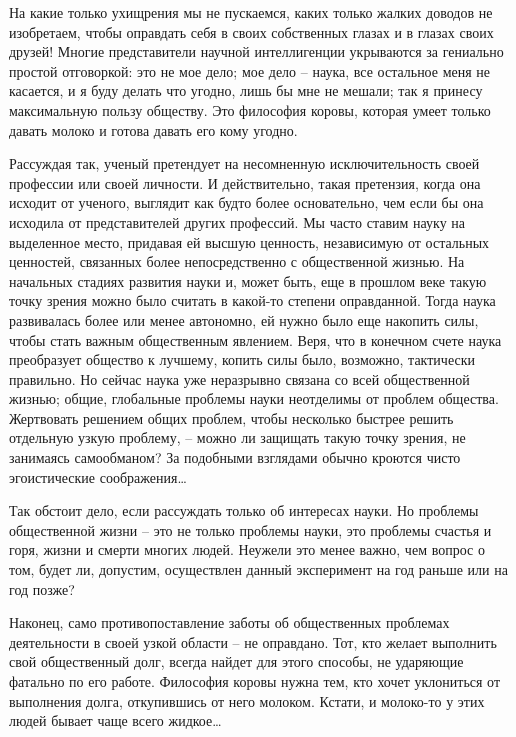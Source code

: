 \documentclass{book}
\begin{document}
На какие только ухищрения мы не пускаемся, каких только жалких доводов не изобретаем, чтобы оправдать себя в своих собственных глазах и в глазах своих друзей! Многие представители научной интеллигенции укрываются за гениально простой отговоркой: это не мое дело; мое дело -- наука, все остальное меня не касается, и я буду делать что угодно, лишь бы мне не мешали; так я принесу максималь­ную пользу обществу. Это философия коровы, которая умеет только давать молоко и готова давать его кому угодно.

Рассуждая так, ученый претендует на несомненную исключительность своей профессии или своей личности. И действительно, такая 
претензия, когда она исходит от ученого, вы­глядит как будто более основательно, чем если бы она исхо­дила от представителей 
других профессий. Мы часто ставим науку на выделенное место, придавая ей высшую ценность, независимую от остальных ценностей, 
связанных более непо­средственно с общественной жизнью. На начальных стадиях развития науки и, может быть, еще в прошлом веке 
такую точку зрения можно было считать в какой-то степени оправ­данной. Тогда наука развивалась более или менее автономно, ей 
нужно было еще накопить силы, чтобы стать важным общест­венным явлением. Веря, что в конечном счете наука преобра­зует общество к 
лучшему, копить силы было, возможно, такти­чески правильно. Но сейчас наука уже неразрывно связана со всей общественной жизнью; 
общие, глобальные проблемы науки неотделимы от проблем общества. Жертвовать решением общих проблем, чтобы несколько быстрее 
решить отдельную узкую проблему, -- можно ли защищать такую точку зрения, не занимаясь самообманом? За подобными взглядами 
обычно кроются чисто эгоистические соображения\ldots

Так обстоит дело, если рассуждать только об интересах науки. Но проблемы общественной жизни -- это не только проблемы науки, это проблемы счастья и горя, жизни и смерти многих людей. Неужели это менее важно, чем вопрос о том, будет ли, допустим, осуществлен данный эксперимент на год раньше или на год позже?

Наконец, само противопоставление заботы об общественных проблемах деятельности в своей узкой области -- не оправдано. Тот, кто желает выполнить свой общественный долг, всегда найдет для этого способы, не ударяющие фатально по его ра­боте. Философия коровы нужна тем, кто хочет уклониться от выполнения долга, откупившись от него молоком. Кстати, и молоко-то у этих людей бывает чаще всего жидкое\ldots
\end{document}
